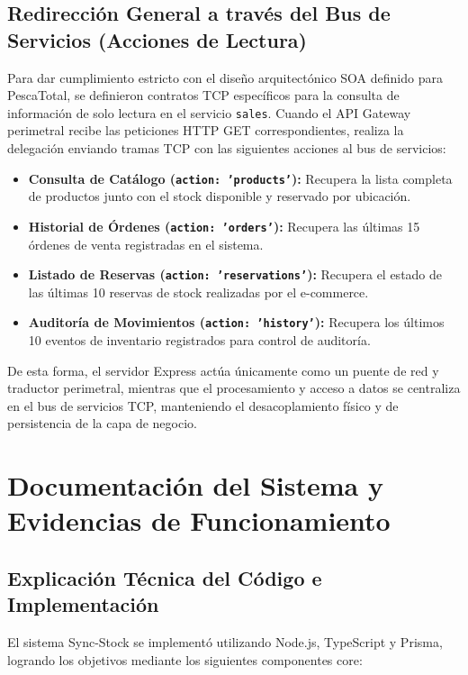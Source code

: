 \documentclass[12pt,a4paper]{article}
\begin{document}
\subsection{Redirección General a través del Bus de Servicios (Acciones de Lectura)}
Para dar cumplimiento estricto con el diseño arquitectónico SOA definido para PescaTotal, se definieron contratos TCP específicos para la consulta de información de solo lectura en el servicio \texttt{sales}. Cuando el API Gateway perimetral recibe las peticiones HTTP GET correspondientes, realiza la delegación enviando tramas TCP con las siguientes acciones al bus de servicios:
\begin{itemize}
    \item \textbf{Consulta de Catálogo (\texttt{action: 'products'}):} Recupera la lista completa de productos junto con el stock disponible y reservado por ubicación.
    \item \textbf{Historial de Órdenes (\texttt{action: 'orders'}):} Recupera las últimas 15 órdenes de venta registradas en el sistema.
    \item \textbf{Listado de Reservas (\texttt{action: 'reservations'}):} Recupera el estado de las últimas 10 reservas de stock realizadas por el e-commerce.
    \item \textbf{Auditoría de Movimientos (\texttt{action: 'history'}):} Recupera los últimos 10 eventos de inventario registrados para control de auditoría.
\end{itemize}
De esta forma, el servidor Express actúa únicamente como un puente de red y traductor perimetral, mientras que el procesamiento y acceso a datos se centraliza en el bus de servicios TCP, manteniendo el desacoplamiento físico y de persistencia de la capa de negocio.

\newpage
\section{Documentación del Sistema y Evidencias de Funcionamiento}

\subsection{Explicación Técnica del Código e Implementación}

El sistema Sync-Stock se implementó utilizando Node.js, TypeScript y Prisma, logrando los objetivos mediante los siguientes componentes core:
\end{document}
